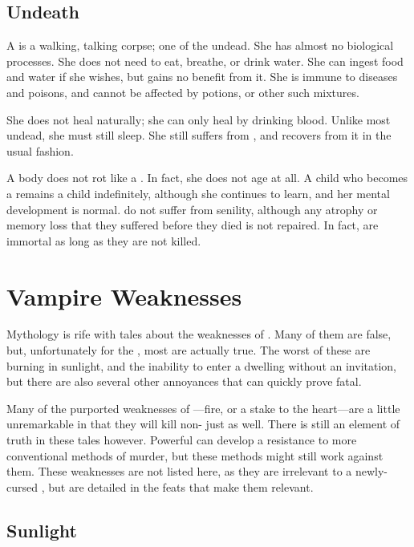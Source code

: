 \subsection{Undeath}

A {\vampire} is a walking, talking corpse; one of the undead.
She has almost no biological processes.
She does not need to eat, breathe, or drink water.
She can ingest food and water if she wishes, but gains no benefit from it.
She is immune to diseases and poisons, and cannot be affected by potions, or other such mixtures.

She does not heal naturally; she can only heal by drinking blood.
Unlike most undead, she must still sleep.
She still suffers from {\exhaustion}, and recovers from it in the usual fashion.

A {\vampirepossessive} body does not rot like a .
In fact, she does not age at all.
A child who becomes a {\vampire} remains a child indefinitely, although she continues to learn, and her mental development is normal.
\capital{\vampires} do not suffer from senility, although any atrophy or memory loss that they suffered before they died is not repaired.
In fact, {\vampires} are immortal as long as they are not killed.

\section{Vampire Weaknesses}

Mythology is rife with tales about the weaknesses of {\vampires}.
Many of them are false, but, unfortunately for the {\vampires}, most are actually true.
The worst of these are burning in sunlight, and the inability to enter a dwelling without an invitation, but there are also several other annoyances that can quickly prove fatal.

Many of the purported weaknesses of {\vampires}---fire, or a stake to the heart---are a little unremarkable in that they will kill non-{\vampires} just as well.
There is still an element of truth in these tales however.
Powerful {\vampires} can develop a resistance to more conventional methods of murder, but these methods might still work against them.
These weaknesses are not listed here, as they are irrelevant to a newly-cursed {\vampire}, but are detailed in the feats that make them relevant.

\subsection{Sunlight}



